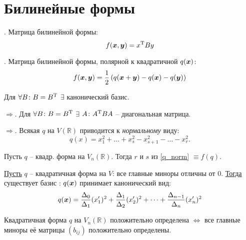 \section{Билинейные формы}

\noindent
\socrat. Матрица билинейной формы:
\begin{equation}
     f(\mbox{\boldmath $x$}, \mbox{\boldmath $y$}) = x^{\text{T}} B y
\end{equation} 

\noindent
\socrat. Матрица билинейной формы, полярной к квадратичной $q(\mbox{\boldmath $x$})$:
\begin{equation}
     f(\mbox{\boldmath $x$}, \mbox{\boldmath $y$}) = \frac{1}{2} \left(q(\mbox{\boldmath $x$} + \mbox{\boldmath $y$}) - q(\mbox{\boldmath $x$}) - q(\mbox{\boldmath $y$})\right)
\end{equation} 

\begin{to_thr}
    Для  $\forall B\colon B = B^{\text{T}}$ $\exists$ канонический базис.
\end{to_thr}

\noindent
$\boxed{\Rightarrow}$. Для  $\forall B\colon B = B^{\text{T}}$ $\exists$ $A \colon A^{\text{T}} B A$ -- диагональная матрица. 

\noindent
$\boxed{\Rightarrow}$. Всякая $q$ на $V(\mathbb{R})$ приводится к \textit{нормальному} виду:
\begin{equation}
\label{q_norm}
    q(x) = x_1^2 + \dots + x_s^2 - x_{s+1}^2 - \dots - x_r^2.
\end{equation}

\begin{to_thr}
    Пусть $q$ -- квадр. форма на $V_n(\mathbb{R})$. Тогда $r$ и $s$ из \eqref{q_norm} $\equiv f(q)$.
\end{to_thr}


\begin{to_thr}
    \underline{Пусть} $q$ -- квадратичная форма на $V$: все главные миноры отличны от 0. \underline{Тогда} существует базис :  $q(\mbox{\boldmath $x$})$ принимает канонический вид:
    \begin{equation}
        q(\mbox{\boldmath $x$}) = \frac{\Delta_0}{\Delta_1} (x_1')^2 + \frac{\Delta_1}{\Delta_2} (x_2')^2 + \dots + \frac{\Delta_{n-1}}{\Delta_n} (x_n')^2
    \end{equation}
\end{to_thr}

\begin{to_thr}
    Квадратичная форма $q$ на $V_n(\mathbb{R})$  положительно определена $\Leftrightarrow$ все главные миноры её матрицы $(b_{ij})$ положительно определены.
\end{to_thr}

